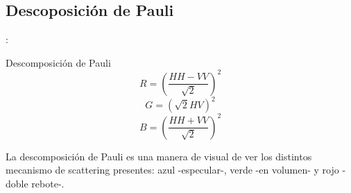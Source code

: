 
\subsection{Descoposición de Pauli}

\begin{frame}{\secname : \subsecname}
     \begin{block}{Descomposición de Pauli}
      \begin{equation}
        R = \left(\frac{HH-VV}{\sqrt{2}}\right)^2
      \end{equation}
      \begin{equation}
        G = \left(\sqrt{2}HV\right)^2
      \end{equation}
      \begin{equation}
        B = \left(\frac{HH+VV}{\sqrt{2}}\right)^2
      \end{equation}
     \end{block}
    La descomposición de Pauli es una manera de visual de ver los distintos mecanismo de scattering presentes: azul -especular-, verde -en volumen- y rojo -doble rebote-.
\end{frame}

